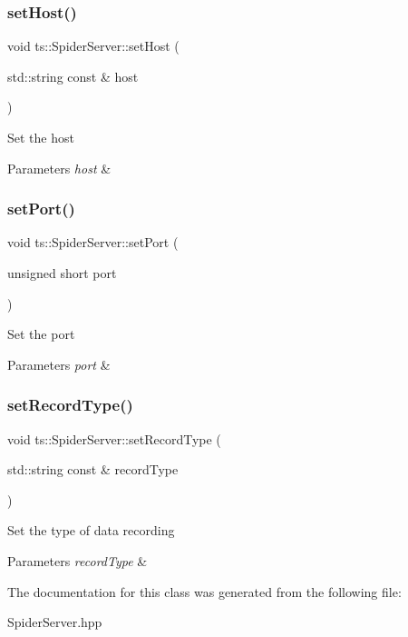 \subsubsection{\texorpdfstring{set\+Host()}{setHost()}}
{\footnotesize\ttfamily void ts\+::\+Spider\+Server\+::set\+Host (\begin{DoxyParamCaption}\item[{std\+::string const \&}]{host }\end{DoxyParamCaption})}

Set the host 
\begin{DoxyParams}{Parameters}
{\em host} & \\
\hline
\end{DoxyParams}
\mbox{\label{classts_1_1_spider_server_afe31d95fbbdf53ca31fd3e80fdef734d}} 
\subsubsection{\texorpdfstring{set\+Port()}{setPort()}}
{\footnotesize\ttfamily void ts\+::\+Spider\+Server\+::set\+Port (\begin{DoxyParamCaption}\item[{unsigned short}]{port }\end{DoxyParamCaption})}

Set the port 
\begin{DoxyParams}{Parameters}
{\em port} & \\
\hline
\end{DoxyParams}
\mbox{\label{classts_1_1_spider_server_a41cb70d329d84fbb37199556ca5e1fea}} 
\subsubsection{\texorpdfstring{set\+Record\+Type()}{setRecordType()}}
{\footnotesize\ttfamily void ts\+::\+Spider\+Server\+::set\+Record\+Type (\begin{DoxyParamCaption}\item[{std\+::string const \&}]{record\+Type }\end{DoxyParamCaption})}

Set the type of data recording 
\begin{DoxyParams}{Parameters}
{\em record\+Type} & \\
\hline
\end{DoxyParams}


The documentation for this class was generated from the following file\+:\begin{DoxyCompactItemize}
\item 
Spider\+Server.\+hpp\end{DoxyCompactItemize}
